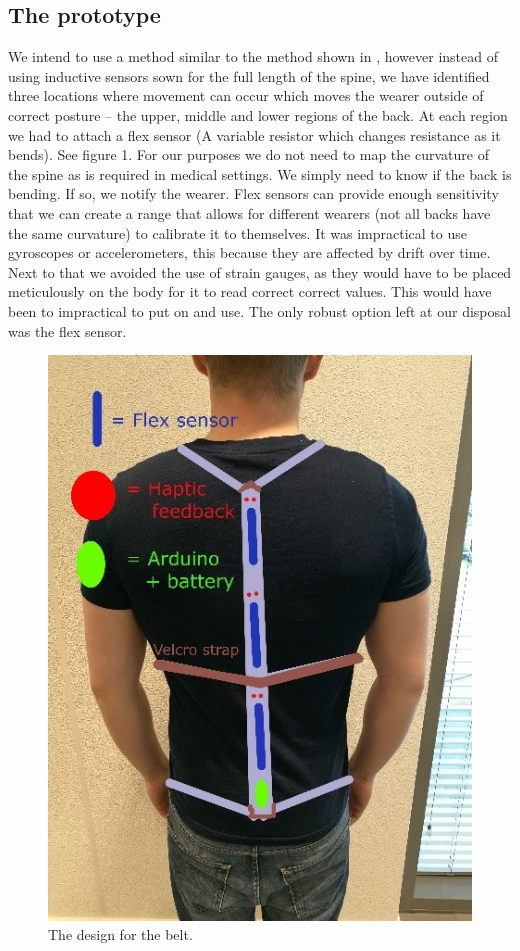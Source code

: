 \documentclass[sigconf]{acmart}
\begin{document}
\subsection{The prototype}

We intend to use a method similar to the method shown in \cite{sardini2015wireless}, however instead of using inductive sensors sown for the full length of the spine, we have identified three locations where movement can occur which moves the wearer outside of correct posture – the upper, middle and lower regions of the back. At each region we had to attach a flex sensor (A variable resistor which changes resistance as it bends). See figure 1.  For our purposes we do not need to map the curvature of the spine as is required in medical settings. We simply need to know if the back is bending. If so, we notify the wearer. Flex sensors can provide enough sensitivity that we can create a range that allows for different wearers (not all backs have the same curvature) to calibrate it to themselves. It was impractical to use gyroscopes or accelerometers, this because they are affected by drift over time. \cite{papi2017wearable}  Next to that we avoided the use of strain gauges, as they would have to be placed meticulously on the body for it to read correct correct values. \cite{papi2017wearable} This would have been to impractical to put on and use. The only robust option left at our disposal was the flex sensor. \linebreak

\begin{figure}[th]
\centering
\includegraphics[scale=1]{Ben_Prototype.jpg}
\caption{The design for the belt.}
\end{figure}
\end{document}
